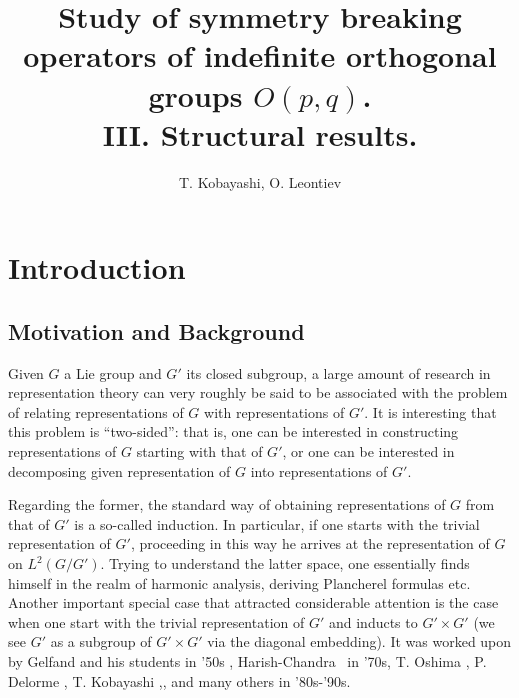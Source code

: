 \documentclass{article}
\numberwithin{definition}{section}
\numberwithin{lemma}{section}
\numberwithin{proposition}{section}
{\theorembodyfont{\rmfamily}\newtheorem{remark}{Remark}
\numberwithin{remark}{section}
}
\begin{document}
\title{Study of symmetry breaking operators of indefinite orthogonal groups $O( p, q)$.\\ 
III. Structural results.}
\author{T. Kobayashi, O. Leontiev}
\maketitle

{\tableofcontents}

\setcounter{section}{15}
\section{Introduction}

\subsection{Motivation and Background}

Given $G$ a Lie group and $G'$ its closed subgroup, a large amount of research
in representation theory can very roughly be said to be associated with the
problem of relating representations of $G$ with representations of $G'$. It is
interesting that this problem is ``two-sided'': that is, one can be interested
in constructing representations of $G$ starting with that of $G'$, or one can
be interested in decomposing given representation of $G$ into representations
of $G'$.

Regarding the former, the standard way of obtaining representations of $G$
from that of $G'$ is a so-called induction. In particular, if one starts with
the trivial representation of $G'$, proceeding in this way he arrives at the
representation of $G$ on $L^2 ( G / G')$. Trying to understand the latter
space, one essentially finds himself in the realm of harmonic analysis,
deriving Plancherel formulas etc. Another important special case that
attracted considerable attention is the case when one start with the trivial
representation of $G'$ and inducts to $G' \times G'$ (we see $G'$ as a
subgroup of $G' \times G'$ via the diagonal embedding). It was worked upon by
Gelfand and his students {\cite{gelfand1966generalized}} in '50s ,
Harish-Chandra {\cite{harishchandra1978harmonic}} \ in '70s, T. Oshima
{\cite{oshima1984description}}, P. Delorme {\cite{delorme1998plancherel}}, T.
Kobayashi
{\cite{kobayashi1994discrete1}},{\cite{kobayashi1998discrete2}},{\cite{kobayashi1998discrete3}}
and many others in '80s-'90s.
\end{document}
